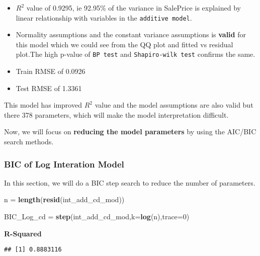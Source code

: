 \documentclass[]{article}
\newenvironment{Shaded}{\begin{snugshade}}{\end{snugshade}}
\newcommand{\KeywordTok}[1]{\textcolor[rgb]{0.13,0.29,0.53}{\textbf{#1}}}
\newcommand{\DataTypeTok}[1]{\textcolor[rgb]{0.13,0.29,0.53}{#1}}
\newcommand{\DecValTok}[1]{\textcolor[rgb]{0.00,0.00,0.81}{#1}}
\newcommand{\StringTok}[1]{\textcolor[rgb]{0.31,0.60,0.02}{#1}}
\newcommand{\OperatorTok}[1]{\textcolor[rgb]{0.81,0.36,0.00}{\textbf{#1}}}
\newcommand{\NormalTok}[1]{#1}
\begin{document}
\begin{itemize}
\item
  \(R^2\) value of 0.9295, ie 92.95\% of the variance in SalePrice is
  explained by linear relationship with variables in the
  \texttt{additive\ model}.
\item
  Normality assumptions and the constant variance assumptions is
  \textbf{valid} for this model which we could see from the QQ plot and
  fitted vs residual plot.The high p-value of \texttt{BP\ test} and
  \texttt{Shapiro-wilk\ test} confirms the same.
\item
  Train RMSE of 0.0926
\item
  Test RMSE of 1.3361
\end{itemize}

This model has improved \(R^2\) value and the model assumptions are also
valid but there 378 parameters, which will make the model interpretation
difficult.

Now, we will focus on \textbf{reducing the model parameters} by using
the AIC/BIC search methods.

\subsubsection{BIC of Log Interation
Model}\label{bic-of-log-interation-model}

In this section, we will do a BIC step search to reduce the number of
parameters.

\begin{Shaded}
\begin{Highlighting}[]
\NormalTok{n =}\StringTok{ }\KeywordTok{length}\NormalTok{(}\KeywordTok{resid}\NormalTok{(int_add_cd_mod))}

\NormalTok{BIC_Log_cd =}\StringTok{ }\KeywordTok{step}\NormalTok{(int_add_cd_mod,}\DataTypeTok{k=}\KeywordTok{log}\NormalTok{(n),}\DataTypeTok{trace=}\DecValTok{0}\NormalTok{)}
\end{Highlighting}
\end{Shaded}

\textbf{R-Squared}

\begin{Shaded}
\end{Shaded}

\begin{verbatim}
## [1] 0.8883116
\end{verbatim}
\end{document}
